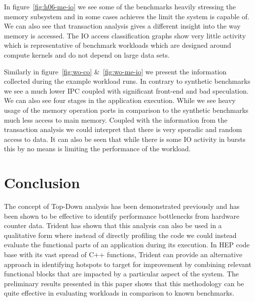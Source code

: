 \documentclass{webofc}
\begin{document}
In figure~\ref{fig:h06-me-io} we see some of the benchmarks heavily stressing the memory subsystem and in some cases achieves the limit the system is capable of. We can also see that transaction analysis gives a different insight into the way memory is accessed. The IO access classification graphs show very little activity which is representative of benchmark workloads which are designed around compute kernels and do not depend on large data sets.

Similarly in figure~\ref{fig:wo-co} \&~\ref{fig:wo-me-io} we present the information collected during the example workload runs. In contrary to synthetic benchmarks we see a much lower IPC coupled with significant front-end and bad speculation. We can also see four stages in the application execution. While we see heavy usage of the memory operation ports in comparison to the synthetic benchmarks much less access to main memory. Coupled with the information from the transaction analysis we could interpret that there is very sporadic and random access to data. It can also be seen that while there is some IO activity in bursts this by no means is limiting the performance of the workload.


\section{Conclusion}

The concept of Top-Down analysis has been demonstrated previously and has been shown to be effective to identify performance bottlenecks from hardware counter data. Trident has shown that this analysis can also be used in a qualitative form where instead of directly profiling the code we could instead evaluate the functional parts of an application during its execution. In HEP code base with its vast spread of C++ functions, Trident can provide an alternative approach in identifying hotspots to target for improvement by combining relevant functional blocks that are impacted by a particular aspect of the system. The preliminary results presented in this paper shows that this methodology can be quite effective in evaluating workloads in comparison to known benchmarks.


\end{document}
